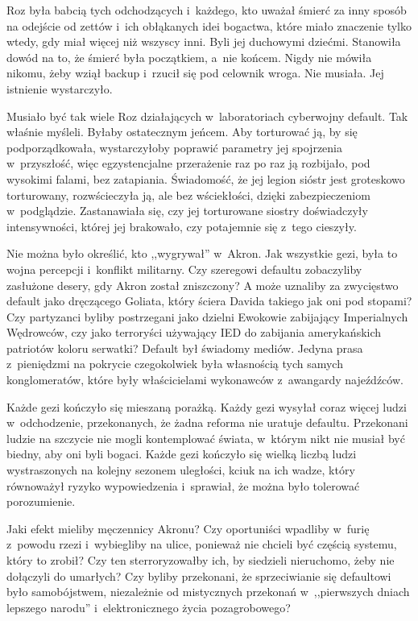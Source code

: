 \documentclass[oneside,polish,11pt,sfheadings]{mwbk}
\begin{document}
Roz była babcią tych odchodzących i~każdego, kto uważał śmierć za inny
sposób na odejście od zettów i~ich obłąkanych idei bogactwa, które miało
znaczenie tylko wtedy, gdy miał więcej niż wszyscy inni. Byli jej
duchowymi dziećmi. Stanowiła dowód na to, że śmierć była początkiem, a~nie końcem. Nigdy nie mówiła nikomu, żeby wziął backup i~rzucił się pod
celownik wroga. Nie musiała. Jej istnienie wystarczyło.

Musiało być tak wiele Roz działających w~laboratoriach cyberwojny
default. Tak właśnie myśleli. Byłaby ostatecznym jeńcem. Aby torturować
ją, by się podporządkowała, wystarczyłoby poprawić parametry jej
spojrzenia w~przyszłość, więc egzystencjalne przerażenie raz po raz ją
rozbijało, pod wysokimi falami, bez zatapiania. Świadomość, że jej
legion sióstr jest groteskowo torturowany, rozwścieczyła ją, ale bez
wściekłości, dzięki zabezpieczeniom w~podglądzie. Zastanawiała się, czy
jej torturowane siostry doświadczyły intensywności, której jej
brakowało, czy potajemnie się z~tego cieszyły.

Nie można było określić, kto ,,wygrywał'' w~Akron. Jak wszystkie gezi,
była to wojna percepcji i~konflikt militarny. Czy szeregowi defaultu
zobaczyliby zasłużone desery, gdy Akron został zniszczony? A może
uznaliby za zwycięstwo default jako dręczącego Goliata, który ściera
Davida takiego jak oni pod stopami? Czy partyzanci byliby postrzegani
jako dzielni Ewokowie zabijający Imperialnych Wędrowców, czy jako
terroryści używający IED do zabijania amerykańskich patriotów koloru
serwatki? Default był świadomy mediów. Jedyna prasa z~pieniędzmi na
pokrycie czegokolwiek była własnością tych samych konglomeratów, które
były właścicielami wykonawców z~awangardy najeźdźców.

Każde gezi kończyło się mieszaną porażką. Każdy gezi wysyłał coraz
więcej ludzi w~odchodzenie, przekonanych, że żadna reforma nie uratuje
defaultu. Przekonani ludzie na szczycie nie mogli kontemplować świata, w~którym nikt nie musiał być biedny, aby oni byli bogaci. Każde gezi
kończyło się wielką liczbą ludzi wystraszonych na kolejny sezonem
uległości, kciuk na ich wadze, który równoważył ryzyko wypowiedzenia i~sprawiał, że można było tolerować porozumienie.

Jaki efekt mieliby męczennicy Akronu? Czy oportuniści wpadliby w~furię z~powodu rzezi i~wybiegliby na ulice, ponieważ nie chcieli być częścią
systemu, który to zrobił? Czy ten sterroryzowałby ich, by siedzieli
nieruchomo, żeby nie dołączyli do umarłych? Czy byliby przekonani, że
sprzeciwianie się defaultowi było samobójstwem, niezależnie od
mistycznych przekonań w~,,pierwszych dniach lepszego narodu'' i~elektronicznego życia pozagrobowego?
\end{document}

